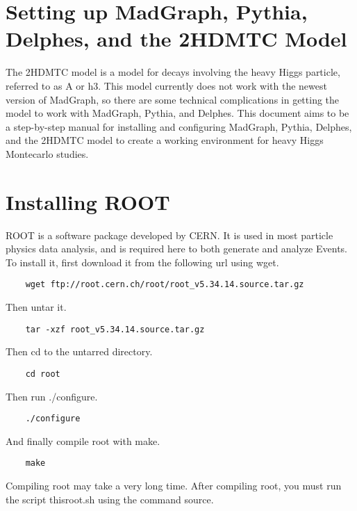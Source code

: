 \documentclass{article}
\begin{document}
\section*{Setting up MadGraph, Pythia, Delphes, and the 2HDMTC Model}

The 2HDMTC model is a model for decays involving the heavy Higgs particle, referred to as A or h3. This model currently does not work with the newest version of MadGraph, so there are some technical complications in getting the model to work with MadGraph, Pythia, and Delphes. This document aims to be a step-by-step manual for installing and configuring MadGraph, Pythia, Delphes, and the 2HDMTC model to create a working environment for heavy Higgs Montecarlo studies.

\section{Installing ROOT}

ROOT is a software package developed by CERN. It is used in most particle physics data analysis, and is required here to both generate and analyze Events. To install it, first download it from the following url using wget.

\begin{verbatim}
	wget ftp://root.cern.ch/root/root_v5.34.14.source.tar.gz
\end{verbatim}

Then untar it.

\begin{verbatim}
	tar -xzf root_v5.34.14.source.tar.gz
\end{verbatim}

Then cd to the untarred directory.

\begin{verbatim}
	cd root
\end{verbatim}

Then run ./configure.

\begin{verbatim}
	./configure
\end{verbatim}

And finally compile root with make.

\begin{verbatim}
	make
\end{verbatim}

Compiling root may take a very long time. After compiling root, you must run the script thisroot.sh using the command source.
\end{document}
